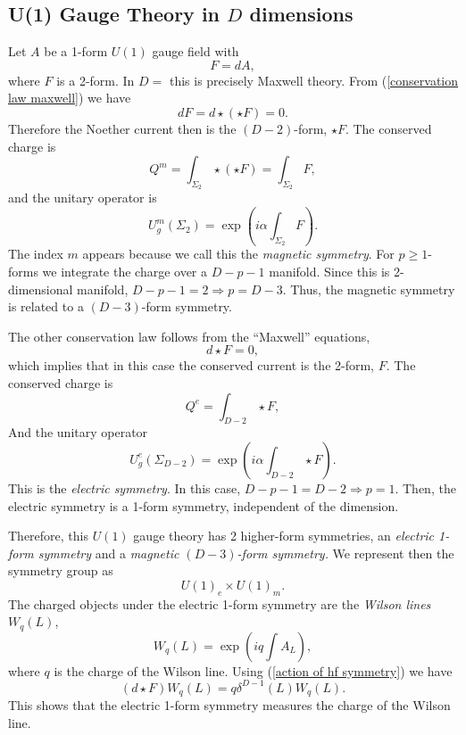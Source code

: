 \documentclass{article}
\begin{document}
\subsection*{U(1) Gauge Theory in $D$ dimensions}
Let $A$ be a 1-form $U(1)$ gauge field with 
\begin{equation}\label{conservation law maxwell}
	F=dA,
\end{equation}
where $F$ is a 2-form. In $D=$ this is precisely Maxwell theory. From (\ref{conservation law maxwell}) we have
\begin{equation}
	dF=d\star(\star F)=0. 
\end{equation}
Therefore the Noether current then is the $(D-2)$-form, $\star F$.  The conserved charge is 
\begin{equation}
	Q^m=\int_{\Sigma_2}\star (\star F)=\int_{\Sigma_2}F,
\end{equation}
and the unitary operator is 
\begin{equation}
	U_g^m(\Sigma_2)=\exp\left(i\alpha\int_{\Sigma_2}F\right).
\end{equation}
The index $m$ appears because we call this the \textit{magnetic symmetry}. For $p\geq 1$-forms we integrate the charge over a $D-p-1$ manifold. Since this is 2-dimensional manifold, $D-p-1=2\Rightarrow p=D-3$. Thus, the magnetic symmetry is related to a $(D-3)$-form symmetry. 

The other conservation law follows from the ``Maxwell'' equations,
\begin{equation}
	d\star F=0,
\end{equation} 
which implies that in this case the conserved current is the 2-form, $F$. The conserved charge is 
\begin{equation}
	Q^e=\int_{D-2}\star F, 
\end{equation}
And the unitary operator
\begin{equation}
	U^e_g(\Sigma_{D-2})=\exp\left(i\alpha\int_{D-2}\star F\right).
\end{equation}
This is the \textit{electric symmetry}. In this case, $D-p-1=D-2\Rightarrow p=1$. Then, the electric symmetry is a 1-form symmetry, independent of the dimension. 

Therefore, this $U(1)$ gauge theory has 2 higher-form symmetries, an \textit{electric 1-form symmetry} and a \textit{magnetic $(D-3)$-form symmetry.} We represent then the symmetry group as 
\begin{equation}
	U(1)_e\times U(1)_m. 
\end{equation}
The charged objects under the electric 1-form symmetry are the \textit{Wilson lines $W_q(L)$},
\begin{equation}
	W_q(L)=\exp\left(iq\int A_L\right),
\end{equation}
where $q$ is the charge of the Wilson line. Using (\ref{action of hf symmetry}) we have
\begin{equation}
	(d\star F)W_q(L)=q\delta^{D-1}(L)W_q(L). 
\end{equation}
This shows that the electric 1-form symmetry measures the charge of the Wilson line.
\end{document}
